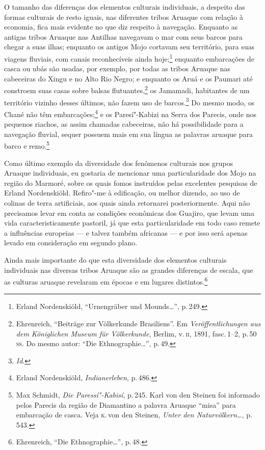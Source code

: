 O tamanho das diferenças dos elementos culturais individuais, a
despeito das formas culturais de resto iguais, nas diferentes tribos
Aruaque com relação à economia, fica mais evidente no que diz respeito
à navegação. Enquanto as antigas tribos Aruaque nas Antilhas navegavam
o mar com seus barcos para chegar a suas ilhas; enquanto os antigos Mojo
cortavam seu território, para suas viagens fluviais, com canais
reconhecíveis ainda hoje;\footnote{Erland Nordenskiöld, ``Urnengräber
  und Mounds\ldots'', p.\,249.} enquanto
embarcações de casca ou ubás são usadas, por exemplo, por todas as
tribos Aruaque nas cabeceiras do Xingu e no Alto Rio Negro; e enquanto
os Aruá e os Paumari até constroem suas casas sobre balsas
flutuantes,\footnote{Ehrenreich, ``Beiträge zur Völkerkunde Brasiliens''.
  Em \textit{Veröffentlichungen aus dem Königlichen Museum für
  Völkerkunde}, Berlim, v.\,\textsc{ii}, 1891, fasc.\,1--2, p.\,50\,\textsc{ss}. Do mesmo
  autor: ``Die Ethnographie\ldots'', p.\,49.} os Jamamadi, habitantes de um
território vizinho desses últimos, não fazem uso de barcos.\footnote{\textit{Id}.} Do mesmo
modo, os Chané não têm embarcações;\footnote{Erland Nordenskiöld,
  \textit{Indianerleben}, p.\,486.} e os
Paresí"-Kabizi na Serra dos Parecis, onde nos pequenos riachos, as assim
chamadas cabeceiras, não há possibilidade para a navegação fluvial,
sequer possuem mais em sua língua as palavras aruaque para barco e
remo.\footnote{Max Schmidt, \textit{Die Paressí"-Kabisí}, p.\,245. Karl
  von den Steinen foi informado pelos Parecis da região de Diamantino a
  palavra Aruaque ``misa'' para embarcação de casca. Veja \textsc{k}.\,von den
  Steinen, \textit{Unter den Naturvölkern\ldots}, p.\,543.}

Como último exemplo da diversidade dos fenômenos culturais nos grupos
Aruaque individuais, eu gostaria de mencionar uma particularidade dos
Mojo na região do Marmoré, sobre os quais fomos instruídos pelas
excelentes pesquisas de Erland Nordenskiöld. Refiro"-me à edificação, ou
melhor dizendo, ao uso de colinas de terra artificiais, aos quais ainda
retornarei posteriormente. Aqui não precisamos levar em conta as
condições econômicas dos Guajiro, que levam uma vida
caracteristicamente pastoril, já que esta particularidade em todo caso
remete a influências europeias --- e talvez também africanas --- e por
isso será apenas levado em consideração em segundo plano.

Ainda mais importante do que esta diversidade dos elementos culturais
individuais nas diversas tribos Aruaque são as grandes diferenças de
escala, que as culturas aruaque revelaram em épocas e em lugares
distintos.\footnote{Ehrenreich, ``Die Ethnographie\ldots'', p.\,48.}

